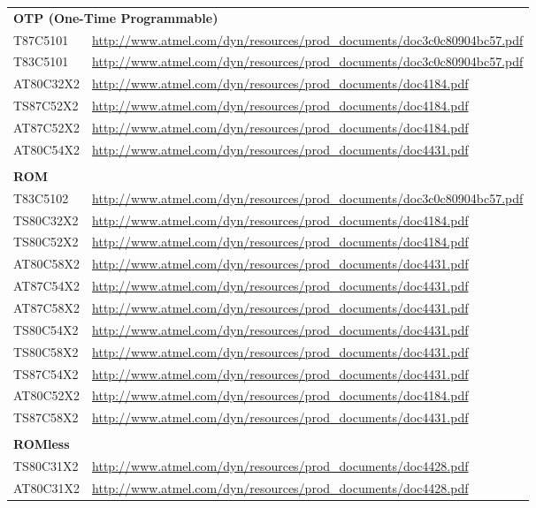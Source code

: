 \documentclass[a4paper,twoside,12pt]{book}
\begin{document}
{\begin{longtable}{ll}
			\multicolumn{2}{l}{\textbf{\small{}OTP (One-Time Programmable)}}					\\
			T87C5101		& \url{http://www.atmel.com/dyn/resources/prod\_documents/doc3c0c80904bc57.pdf}	\\
			T83C5101		& \url{http://www.atmel.com/dyn/resources/prod\_documents/doc3c0c80904bc57.pdf}	\\
			AT80C32X2		& \url{http://www.atmel.com/dyn/resources/prod\_documents/doc4184.pdf}		\\
			TS87C52X2		& \url{http://www.atmel.com/dyn/resources/prod\_documents/doc4184.pdf}		\\
			AT87C52X2		& \url{http://www.atmel.com/dyn/resources/prod\_documents/doc4184.pdf}		\\
			AT80C54X2		& \url{http://www.atmel.com/dyn/resources/prod\_documents/doc4431.pdf}		\\\\

			\multicolumn{2}{l}{\textbf{\small{}ROM}}								\\
			T83C5102		& \url{http://www.atmel.com/dyn/resources/prod\_documents/doc3c0c80904bc57.pdf}	\\
			TS80C32X2		& \url{http://www.atmel.com/dyn/resources/prod\_documents/doc4184.pdf}		\\
			TS80C52X2		& \url{http://www.atmel.com/dyn/resources/prod\_documents/doc4184.pdf}		\\
			AT80C58X2		& \url{http://www.atmel.com/dyn/resources/prod\_documents/doc4431.pdf}		\\
			AT87C54X2		& \url{http://www.atmel.com/dyn/resources/prod\_documents/doc4431.pdf}		\\
			AT87C58X2		& \url{http://www.atmel.com/dyn/resources/prod\_documents/doc4431.pdf}		\\
			TS80C54X2		& \url{http://www.atmel.com/dyn/resources/prod\_documents/doc4431.pdf}		\\
			TS80C58X2		& \url{http://www.atmel.com/dyn/resources/prod\_documents/doc4431.pdf}		\\
			TS87C54X2		& \url{http://www.atmel.com/dyn/resources/prod\_documents/doc4431.pdf}		\\
			AT80C52X2		& \url{http://www.atmel.com/dyn/resources/prod\_documents/doc4184.pdf}		\\
			TS87C58X2		& \url{http://www.atmel.com/dyn/resources/prod\_documents/doc4431.pdf}		\\\\

			\multicolumn{2}{l}{\textbf{\small{}ROMless}}								\\
			TS80C31X2		& \url{http://www.atmel.com/dyn/resources/prod\_documents/doc4428.pdf}		\\
			AT80C31X2		& \url{http://www.atmel.com/dyn/resources/prod\_documents/doc4428.pdf}		\\
		\end{longtable}
		}
\end{document}
